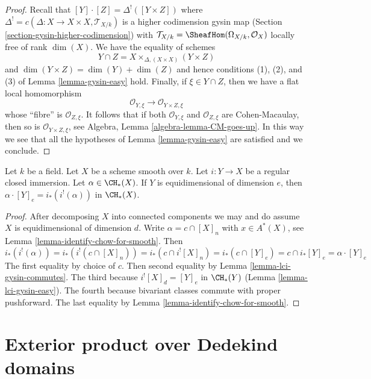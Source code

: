 \begin{proof}
Recall that $[Y] \cdot [Z] = \Delta^!([Y \times Z])$ where
$\Delta^! = c(\Delta : X \to X \times X, \mathcal{T}_{X/k})$
is a higher codimension gysin map
(Section \ref{section-gysin-higher-codimension}) with
$\mathcal{T}_{X/k} = \SheafHom(\Omega_{X/k}, \mathcal{O}_X)$
locally free of rank $\dim(X)$. We have the equality of schemes
$$
Y \cap Z = X \times_{\Delta, (X \times X)} (Y \times Z)
$$
and $\dim(Y \times Z) = \dim(Y) + \dim(Z)$ and hence conditions 
(1), (2), and (3) of Lemma \ref{lemma-gysin-easy} hold.
Finally, if $\xi \in Y \cap Z$, then we have a flat local
homomorphism
$$
\mathcal{O}_{Y, \xi} \longrightarrow
\mathcal{O}_{Y \times Z, \xi}
$$
whose ``fibre'' is $\mathcal{O}_{Z, \xi}$. It follows that if both
$\mathcal{O}_{Y, \xi}$ and $\mathcal{O}_{Z, \xi}$
are Cohen-Macaulay, then so is $\mathcal{O}_{Y \times Z, \xi}$, see
Algebra, Lemma \ref{algebra-lemma-CM-goes-up}.
In this way we see that all the hypotheses of
Lemma \ref{lemma-gysin-easy} are satisfied and we conclude.
\end{proof}

\begin{lemma}
\label{lemma-intersect-regularly-embedded}
Let $k$ be a field. Let $X$ be a scheme smooth over $k$. Let $i : Y \to X$ be
a regular closed immersion. Let $\alpha \in \CH_*(X)$. If $Y$ is
equidimensional of dimension $e$, then
$\alpha \cdot [Y]_e = i_*(i^!(\alpha))$ in $\CH_*(X)$.
\end{lemma}

\begin{proof}
After decomposing $X$ into connected components we may and do assume $X$
is equidimensional of dimension $d$. Write $\alpha = c \cap [X]_n$
with $x \in A^*(X)$, see Lemma \ref{lemma-identify-chow-for-smooth}. Then
$$
i_*(i^!(\alpha)) = i_*(i^!(c \cap [X]_n)) =
i_*(c \cap i^![X]_n) = i_*(c \cap [Y]_e) =
c \cap i_*[Y]_e = \alpha \cdot [Y]_e
$$
The first equality by choice of $c$. Then second equality by
Lemma \ref{lemma-lci-gysin-commutes}. The third because
$i^![X]_d = [Y]_e$ in $\CH_*(Y)$ (Lemma \ref{lemma-lci-gysin-easy}).
The fourth because bivariant classes commute with proper pushforward.
The last equality by Lemma \ref{lemma-identify-chow-for-smooth}.
\end{proof}




\section{Exterior product over Dedekind domains}
\label{section-exterior-product-dim-1}

